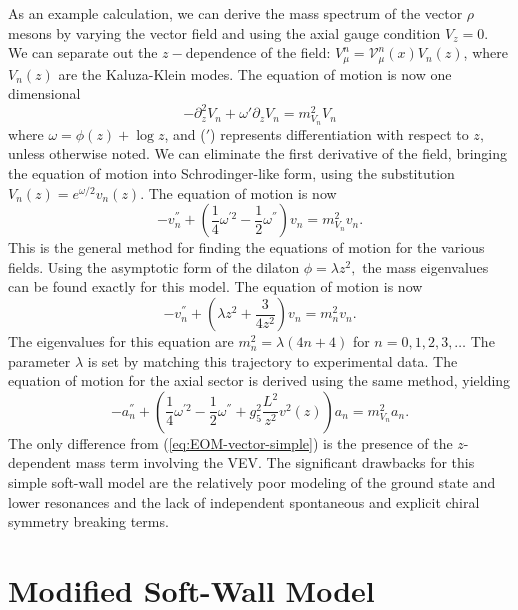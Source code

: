 As an example calculation, we can derive the mass spectrum of the vector $\rho$ mesons by varying the vector field and using the axial gauge condition $V_{z}=0.$ 
We can separate out the $z-$dependence of the field: $V_{\mu}^{n}=\mathcal{V}_{\mu}^{n}(x)V_{n}(z)$, where$V_{n}(z)$ are the Kaluza-Klein modes. 
The equation of motion is now one dimensional
\begin{equation}
-\partial_{z}^{2}V_{n}+\omega'\partial_{z}V_{n}=m_{V_{n}}^{2}V_{n}\label{eq:vectorEOM1}
\end{equation}
where $\omega=\phi(z)+\log z$, and ($'$) represents differentiation with respect to $z,$ unless otherwise noted. 
We can eliminate the first derivative of the field, bringing the equation of motion into Schrodinger-like form, using the substitution $V_{n}(z)=e^{\omega/2}v_{n}(z)$.
The equation of motion is now
\begin{equation}
-v_{n}^{''}+\left(\frac{1}{4}\omega^{'2}-\frac{1}{2}\omega^{''}\right)v_{n}=m_{V_{n}}^{2}v_{n}.\label{eq:EOM-vector-simple}
\end{equation}
This is the general method for finding the equations of motion for the various fields. 
Using the asymptotic form of the dilaton $\phi=\lambda z^{2},$ the mass eigenvalues can be found exactly for this model. The equation of motion is now
\begin{equation}
-v_{n}^{''}+\left(\lambda z^{2}+\frac{3}{4z^{2}}\right)v_{n}=m_{n}^{2}v_{n}.
\end{equation}
The eigenvalues for this equation are $m_{n}^{2}=\lambda(4n+4)$ for $n=0,1,2,3,\dots$ 
The parameter $\lambda$ is set by matching this trajectory to experimental data. 
The equation of motion for the axial sector is derived using the same method, yielding
\begin{equation}
-a_{n}^{''}+\left(\frac{1}{4}\omega^{'2}-\frac{1}{2}\omega^{''}+g_{5}^{2}\frac{L^{2}}{z^{2}}v^{2}(z)\right)a_{n}=m_{V_{n}}^{2}a_{n}.\label{eq:EOM-axial-simple}
\end{equation}
The only difference from (\ref{eq:EOM-vector-simple}) is the presence of the $z$-dependent mass term involving the VEV. 
The significant drawbacks for this simple soft-wall model are the relatively poor modeling of the ground state and lower resonances and the lack of independent spontaneous and explicit chiral symmetry
breaking terms.


\section{Modified Soft-Wall Model\label{sub:Modified-Soft-Wall-Model}}

